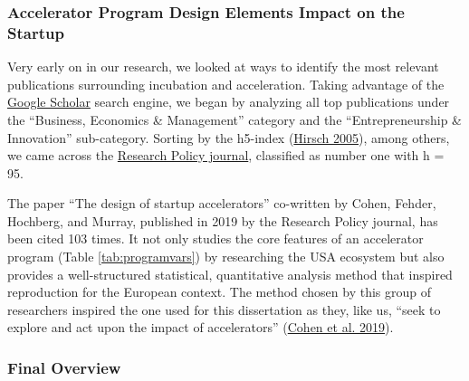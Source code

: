 \documentclass[
  12pt,
]{article}
\begin{document}

\hypertarget{review-design-elements}{%
\subsubsection{Accelerator Program Design Elements Impact on the Startup}\label{review-design-elements}}

Very early on in our research, we looked at ways to identify the most relevant publications surrounding incubation and acceleration. Taking advantage of the \href{https://scholar.google.com/}{Google Scholar} search engine, we began by analyzing all top publications under the ``Business, Economics \& Management'' category and the ``Entrepreneurship \& Innovation'' sub-category. Sorting by the h5-index (\protect\hyperlink{ref-hirsch_index_2005}{Hirsch 2005}), among others, we came across the \href{https://www.journals.elsevier.com/research-policy}{Research Policy journal}, classified as number one with h = 95.

The paper ``The design of startup accelerators'' co-written by Cohen, Fehder, Hochberg, and Murray, published in 2019 by the Research Policy journal, has been cited 103 times. It not only studies the core features of an accelerator program (Table \ref{tab:programvars}) by researching the USA ecosystem but also provides a well-structured statistical, quantitative analysis method that inspired reproduction for the European context. The method chosen by this group of researchers inspired the one used for this dissertation as they, like us, ``seek to explore and act upon the impact of accelerators'' (\protect\hyperlink{ref-cohen_design_2019}{Cohen et al. 2019}).

\hypertarget{final-overview}{%
\subsubsection{Final Overview}\label{final-overview}}
\end{document}
